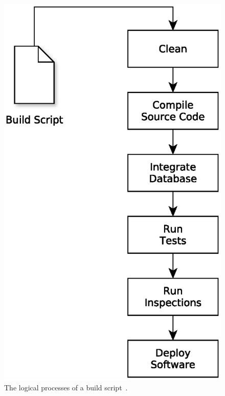 \begin{figure}[H]
    \centering
    \includegraphics[scale=0.5]{yEd/the_logical_processes_of_a_build_script.eps}
    \caption{The logical processes of a build script~\cite{CIbook}.}
    \label{fig:lpobs}
\end{figure}

